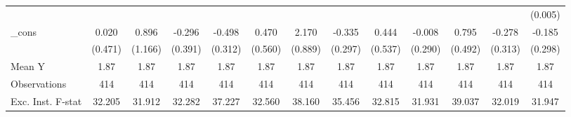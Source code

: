 {\begin{tabular}{l*{12}{c}}
            &                     &                     &                     &                     &                     &                     &                     &                     &                     &                     &                     &     (0.005)         \\
\addlinespace
\_cons      &       0.020         &       0.896         &      -0.296         &      -0.498         &       0.470         &       2.170\sym{**} &      -0.335         &       0.444         &      -0.008         &       0.795         &      -0.278         &      -0.185         \\
            &     (0.471)         &     (1.166)         &     (0.391)         &     (0.312)         &     (0.560)         &     (0.889)         &     (0.297)         &     (0.537)         &     (0.290)         &     (0.492)         &     (0.313)         &     (0.298)         \\
\midrule
Mean Y      &        1.87         &        1.87         &        1.87         &        1.87         &        1.87         &        1.87         &        1.87         &        1.87         &        1.87         &        1.87         &        1.87         &        1.87         \\
Observations&         414         &         414         &         414         &         414         &         414         &         414         &         414         &         414         &         414         &         414         &         414         &         414         \\
Exc. Inst. F-stat&      32.205         &      31.912         &      32.282         &      37.227         &      32.560         &      38.160         &      35.456         &      32.815         &      31.931         &      39.037         &      32.019         &      31.947         \\
\bottomrule
\end{tabular}
}
